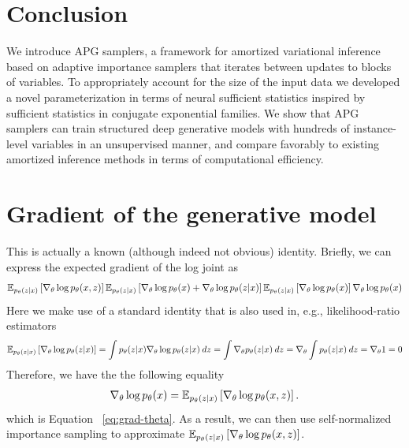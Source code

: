 \documentclass{article}
\theoremstyle{definition}
\begin{document}
\section{Conclusion}
We introduce APG samplers, a framework for amortized variational inference based on adaptive importance samplers that iterates between updates to blocks of variables. To appropriately account for the size of the input data we developed a novel parameterization in terms of neural sufficient statistics inspired by sufficient statistics in conjugate exponential families.
We show that APG samplers can train structured deep generative models with hundreds of instance-level variables in an unsupervised manner, and compare favorably to existing amortized inference methods in terms of computational efficiency.





\newpage
\appendix
\onecolumn
{}
\section{Gradient of the generative model}%
\label{appendix:grad-theta}
This is actually a known (although indeed not obvious) identity. Briefly, we can express the expected gradient of the log joint as
\begin{align*}
    \mathbb{E}_{p_\theta(z | x)} 
    \left[
    \nabla_\theta \log p_\theta(x, z)
    \right]
    \mathbb{E}_{p_\theta(z | x)} 
    \left[
    \nabla_\theta \log p_\theta(x) + \nabla_\theta \log p_\theta(z | x)
    \right]
    \mathbb{E}_{p_\theta(z | x)} 
    \left[
    \nabla_\theta \log p_\theta(x) 
    \right]
    \nabla_\theta \log p_\theta(x)
\end{align*}
Here we make use of a standard identity that is also used in, e.g., likelihood-ratio estimators
\begin{align*}
\mathbb{E}_{p_\theta(z | x)}
\left[
    \nabla_\theta \log p_\theta(z | x)
\right] 
=
\int p_\theta(z | x) \nabla_\theta \log p_\theta(z | x) \: dz
=
\int \nabla_\theta p_\theta(z | x) \: dz
=
\nabla_\theta \int p_\theta(z | x) \: dz
=
\nabla_\theta 1
= 
0
\end{align*}
Therefore, we have the the following equality
\begin{align*}
\nabla_\theta \log p_\theta(x) 
= 
\mathbb{E}_{p_\theta(z | x)} 
\left[
\nabla_\theta \log p_\theta(x, z)
\right].
\end{align*}
which is Equation ~\ref{eq:grad-theta}. As a result, we can then use self-normalized importance sampling to approximate     $\mathbb{E}_{p_\theta(z | x)} \left[\nabla_\theta \log p_\theta(x, z) \right]$.
\end{document}
